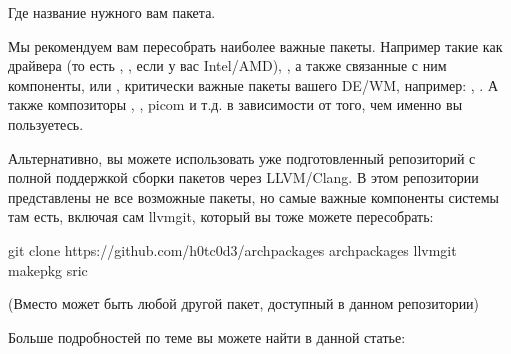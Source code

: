 \documentclass[letterpaper,10pt,russian,openany]{sphinxmanual}
\begin{document}
\sphinxAtStartPar
Где  \sphinxhyphen{} название нужного вам пакета.

\sphinxAtStartPar
Мы рекомендуем вам пересобрать наиболее важные пакеты. Например такие как драйвера (то есть , , если у вас Intel/AMD),
, а также связанные с ним компоненты, или ,
критически важные пакеты вашего DE/WM, например: , .
А также композиторы , , picom и т.д. в зависимости от того, чем именно вы пользуетесь.

\sphinxAtStartPar
Альтернативно, вы можете использовать уже подготовленный репозиторий 
с полной поддержкой сборки пакетов через LLVM/Clang. В этом репозитории представлены не все возможные пакеты, но самые
важные компоненты системы там есть, включая сам llvm\sphinxhyphen{}git, который вы тоже можете пересобрать:

\begin{sphinxVerbatim}[commandchars=\\\{\}]
git clone https://github.com/h0tc0d3/arch\PYGZhy{}packages
 arch\PYGZhy{}packages
 llvm\PYGZhy{}git
makepkg \PYGZhy{}sric
\end{sphinxVerbatim}

\sphinxAtStartPar
(Вместо  может быть любой другой пакет, доступный в данном репозитории)

\sphinxAtStartPar
Больше подробностей по теме вы можете найти в данной статье:

\sphinxAtStartPar
{}

\ignorespaces 
\end{document}
